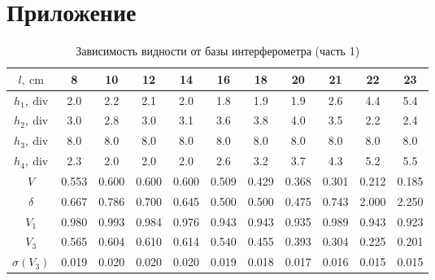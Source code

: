 \documentclass[12pt, a4paper]{article}
\begin{document}
\section{Приложение}
\label{addition}
\begin{table}[h!]
    \centering
    \caption{Зависимость видности от базы интерферометра (часть 1)}
    \begin{tabular}{|c|c|c|c|c|c|c|c|c|c|c|}
        \hline
        $l,~\mathrm{cm}$    & 8     & 10    & 12    & 14    & 16    & 18    & 20    & 21    & 22    & 23    \\
        \hline
        $h_1,~\mathrm{div}$ & 2.0   & 2.2   & 2.1   & 2.0   & 1.8   & 1.9   & 1.9   & 2.6   & 4.4   & 5.4   \\
        \hline
        $h_2,~\mathrm{div}$ & 3.0   & 2.8   & 3.0   & 3.1   & 3.6   & 3.8   & 4.0   & 3.5   & 2.2   & 2.4   \\
        \hline
        $h_3,~\mathrm{div}$ & 8.0   & 8.0   & 8.0   & 8.0   & 8.0   & 8.0   & 8.0   & 8.0   & 8.0   & 8.0   \\
        \hline
        $h_4,~\mathrm{div}$ & 2.3   & 2.0   & 2.0   & 2.0   & 2.6   & 3.2   & 3.7   & 4.3   & 5.2   & 5.5   \\
        \hline
        $V$                 & 0.553 & 0.600 & 0.600 & 0.600 & 0.509 & 0.429 & 0.368 & 0.301 & 0.212 & 0.185 \\
        \hline
        $\delta$            & 0.667 & 0.786 & 0.700 & 0.645 & 0.500 & 0.500 & 0.475 & 0.743 & 2.000 & 2.250 \\
        \hline
        $V_1$               & 0.980 & 0.993 & 0.984 & 0.976 & 0.943 & 0.943 & 0.935 & 0.989 & 0.943 & 0.923 \\
        \hline
        $V_3$               & 0.565 & 0.604 & 0.610 & 0.614 & 0.540 & 0.455 & 0.393 & 0.304 & 0.225 & 0.201 \\
        \hline
        $\sigma(V_3)$       & 0.019 & 0.020 & 0.020 & 0.020 & 0.019 & 0.018 & 0.017 & 0.016 & 0.015 & 0.015 \\
        \hline
    \end{tabular}
\end{table}
\end{document}
